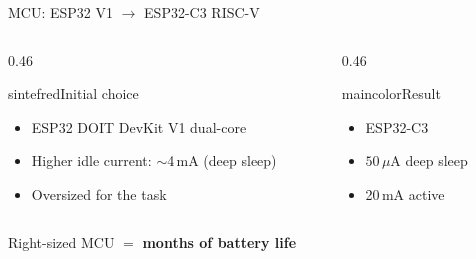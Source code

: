 \begin{frame}{MCU: ESP32 V1 $\rightarrow$ ESP32-C3 RISC-V}
\begin{columns}[T,onlytextwidth]
\begin{column}{0.46\textwidth}
  \begin{colorblock}[white]{sintefred}{Initial choice}
  \large
  \begin{itemize}
    \item ESP32 DOIT DevKit V1 dual-core
    \item Higher idle current: $\sim$4\,mA (deep sleep)
    \item Oversized for the task
  \end{itemize}
  \end{colorblock}
\end{column}
\begin{column}{0.46\textwidth}
  \begin{colorblock}[white]{maincolor}{Result}
  \large
  \begin{itemize}
    \item ESP32-C3 
    \item $50\,\mu\text{A}$ deep sleep
    \item 20\,mA active
  \end{itemize}
  \end{colorblock}
\end{column}
\end{columns}
\vspace{0.5cm}
\centering
{\Large Right-sized MCU $=$ \textbf{months of battery life}}
\end{frame}

